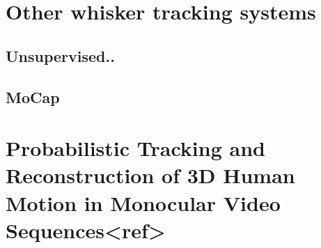 
\section{Other whisker tracking systems}
    \subsection{Unsupervised..}
    \subsection{MoCap}

\section{Probabilistic Tracking and Reconstruction of 3D Human Motion in Monocular Video Sequences<ref>}



